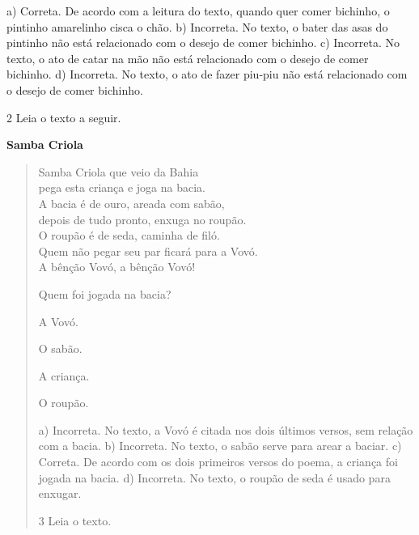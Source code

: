 a) Correta. De acordo com a leitura do texto, quando quer comer
bichinho, o pintinho amarelinho cisca o chão.
b) Incorreta. No texto, o bater das asas do pintinho não está 
relacionado com o desejo de comer bichinho.
c) Incorreta. No texto, o ato de catar na mão não está 
relacionado com o desejo de comer bichinho.
d) Incorreta. No texto, o ato de fazer piu-piu não está 
relacionado com o desejo de comer bichinho.

\num{2} Leia o texto a seguir.

\textbf{Samba Criola}

\begin{verse}
Samba Criola que veio da Bahia\\
pega esta criança e joga na bacia.\\
A bacia é de ouro, areada com sabão,\\
depois de tudo pronto, enxuga no roupão.\\
O roupão é de seda, caminha de filó.\\
Quem não pegar seu par ficará para a Vovó.\\
A bênção Vovó, a bênção Vovó!


Quem foi jogada na bacia?

\begin{minipage}{.5\textwidth}
\begin{escolha}
	\item A Vovó.

	\item O sabão.

	\item A criança.

	\item O roupão.
\end{escolha}
\end{minipage}

a) Incorreta. No texto, a Vovó é citada nos dois últimos versos,
sem relação com a bacia. 
b) Incorreta. No texto, o sabão serve para arear a baciar.
c) Correta. De acordo com os dois primeiros versos do poema, a criança
foi jogada na bacia.
d) Incorreta. No texto, o roupão de seda é usado para enxugar.  

\num{3} Leia o texto.


\end{verse}
